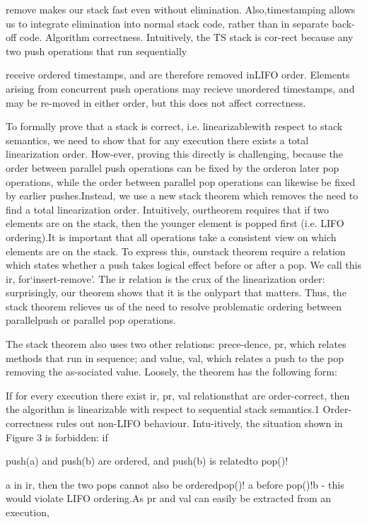 remove makes our stack fast even without elimination. Also,timestamping allows us to integrate elimination into normal
stack code, rather than in separate back-off code.
Algorithm correctness. Intuitively, the TS stack is cor-rect because any two push operations that run sequentially

receive ordered timestamps, and are therefore removed inLIFO order. Elements arising from concurrent push operations may recieve unordered timestamps, and may be re-moved in either order, but this does not affect correctness.

To formally prove that a stack is correct, i.e. linearizablewith respect to stack semantics, we need to show that for
any execution there exists a total linearization order. How-ever, proving this directly is challenging, because the order
between parallel push operations can be fixed by the orderon later pop operations, while the order between parallel
pop operations can likewise be fixed by earlier pushes.Instead, we use a new stack theorem which removes the
need to find a total linearization order. Intuitively, ourtheorem requires that if two elements are on the stack, then
the younger element is popped first (i.e. LIFO ordering).It is important that all operations take a consistent view
on which elements are on the stack. To express this, ourstack theorem require a relation which states whether a push
takes logical effect before or after a pop. We call this ir, for`insert-remove'. The ir relation is the crux of the linearization
order: surprisingly, our theorem shows that it is the onlypart that matters. Thus, the stack theorem relieves us of
the need to resolve problematic ordering between parallelpush or parallel pop operations.

The stack theorem also uses two other relations: prece-dence, pr, which relates methods that run in sequence; and
value, val, which relates a push to the pop removing the as-sociated value. Loosely, the theorem has the following form:

If for every execution there exist ir, pr, val relationsthat are order-correct, then the algorithm is linearizable with respect to sequential stack semantics.1
Order-correctness rules out non-LIFO behaviour. Intu-itively, the situation shown in Figure 3 is forbidden: if

push(a) and push(b) are ordered, and push(b) is relatedto pop()!

a in ir, then the two pops cannot also be orderedpop()!
a before pop()!b - this would violate LIFO ordering.As pr and val can easily be extracted from an execution,

